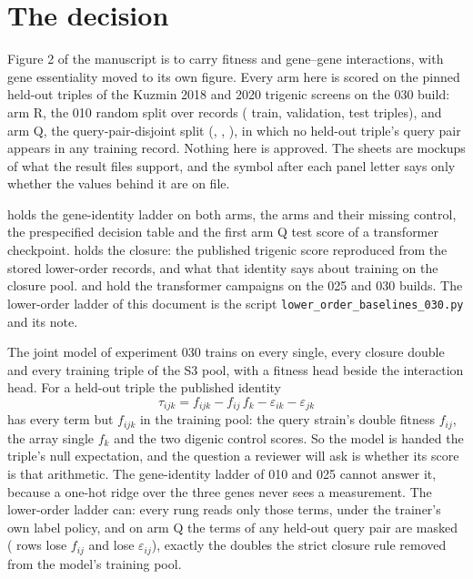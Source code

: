
\section{The decision}
\label{sec:decision}

Figure 2 of the manuscript is to carry fitness and gene--gene interactions, with gene
essentiality moved to its own figure. Every arm here is scored on the pinned held-out
triples of the Kuzmin 2018 and 2020 trigenic screens on the 030 build: arm R, the 010
random split over records (\gnRTrain{} train, \gnRVal{} validation, \gnRTest{} test
triples), and arm Q, the query-pair-disjoint split (\gnQTrain{}, \gnQVal{}, \gnQTest{}),
in which no held-out triple's query pair appears in any training record. Nothing here is
approved. The sheets are mockups of what the result files support, and the symbol after
each panel letter says only whether the values behind it are on file.

  holds the gene-identity
ladder on both arms, the arms and their missing control, the prespecified decision table
and the first arm Q test score of a transformer checkpoint.  holds the
closure: the published trigenic score reproduced from the stored lower-order records, and
what that identity says about training on the closure pool.  and
 hold the transformer campaigns on the 025 and 030 builds. The
lower-order ladder of this document is the script
\texttt{lower\_order\_baselines\_030.py} and its note.

 The joint model
of experiment 030 trains on every single, every closure double and every training triple
of the S3 pool, with a fitness head beside the interaction head. For a held-out triple the
published identity
\begin{equation}
  \tau_{ijk} = f_{ijk} - f_{ij}\,f_k - \varepsilon_{ik} - \varepsilon_{jk}
  \label{eq:identity}
\end{equation}
has every term but $f_{ijk}$ in the training pool: the query strain's double fitness
$f_{ij}$, the array single $f_k$ and the two digenic control scores. So the model is handed
the triple's null expectation, and the question a reviewer will ask is whether its score is
that arithmetic. The gene-identity ladder of 010 and 025 cannot answer it, because a
one-hot ridge over the three genes never sees a measurement. The lower-order ladder can:
every rung reads only those terms, under the trainer's own label policy, and on arm Q the
terms of any held-out query pair are masked (\gmaskQFijq{} rows lose $f_{ij}$ and
\gmaskQEpsij{} lose $\varepsilon_{ij}$), exactly the doubles the strict closure rule
removed from the model's training pool.

